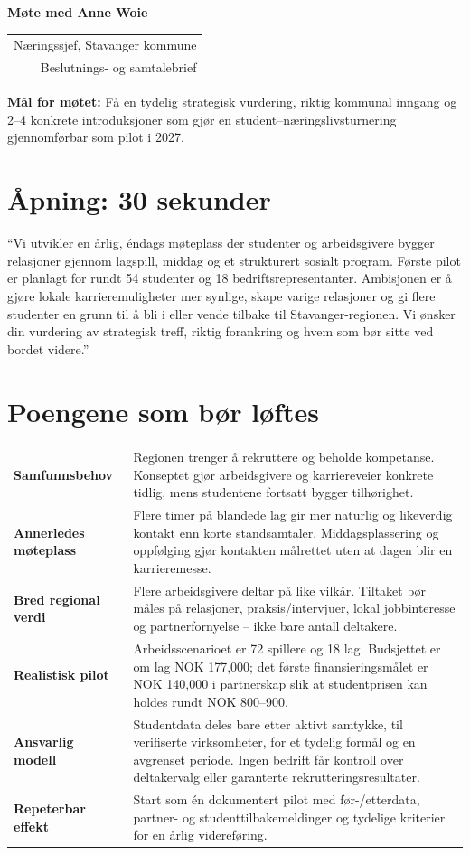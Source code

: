 \documentclass[10pt,a4paper]{article}
\newcommand{\tagline}[1]{\colorbox{mint}{\parbox{0.965\linewidth}{\color{ink}\small #1}}}
\begin{document}
{\Huge\bfseries\color{ink} Møte med Anne Woie}\hfill
{\small\color{muted}\begin{tabular}{r}Næringssjef, Stavanger kommune\\Beslutnings- og samtalebrief\end{tabular}}

\vspace{2mm}
\tagline{\textbf{Mål for møtet:} Få en tydelig strategisk vurdering, riktig kommunal inngang og 2--4 konkrete introduksjoner som gjør en student--næringslivsturnering gjennomførbar som pilot i 2027.}

\section{Åpning: 30 sekunder}

``Vi utvikler en årlig, éndags møteplass der studenter og arbeidsgivere bygger relasjoner gjennom lagspill, middag og et strukturert sosialt program. Første pilot er planlagt for rundt 54 studenter og 18 bedriftsrepresentanter. Ambisjonen er å gjøre lokale karrieremuligheter mer synlige, skape varige relasjoner og gi flere studenter en grunn til å bli i eller vende tilbake til Stavanger-regionen. Vi ønsker din vurdering av strategisk treff, riktig forankring og hvem som bør sitte ved bordet videre.''

\section{Poengene som bør løftes}

\begin{tabularx}{\linewidth}{>{\raggedright\arraybackslash\bfseries\color{green}}p{34mm} X}
Samfunnsbehov & Regionen trenger å rekruttere og beholde kompetanse. Konseptet gjør arbeidsgivere og karriereveier konkrete tidlig, mens studentene fortsatt bygger tilhørighet.\\[2.2mm]
Annerledes møteplass & Flere timer på blandede lag gir mer naturlig og likeverdig kontakt enn korte standsamtaler. Middagsplassering og oppfølging gjør kontakten målrettet uten at dagen blir en karrieremesse.\\[2.2mm]
Bred regional verdi & Flere arbeidsgivere deltar på like vilkår. Tiltaket bør måles på relasjoner, praksis/intervjuer, lokal jobbinteresse og partnerfornyelse -- ikke bare antall deltakere.\\[2.2mm]
Realistisk pilot & Arbeidsscenarioet er 72 spillere og 18 lag. Budsjettet er om lag NOK 177,000; det første finansieringsmålet er NOK 140,000 i partnerskap slik at studentprisen kan holdes rundt NOK 800--900.\\[2.2mm]
Ansvarlig modell & Studentdata deles bare etter aktivt samtykke, til verifiserte virksomheter, for et tydelig formål og en avgrenset periode. Ingen bedrift får kontroll over deltakervalg eller garanterte rekrutteringsresultater.\\[2.2mm]
Repeterbar effekt & Start som én dokumentert pilot med før-/etterdata, partner- og studenttilbakemeldinger og tydelige kriterier for en årlig videreføring.\\
\end{tabularx}
\end{document}
